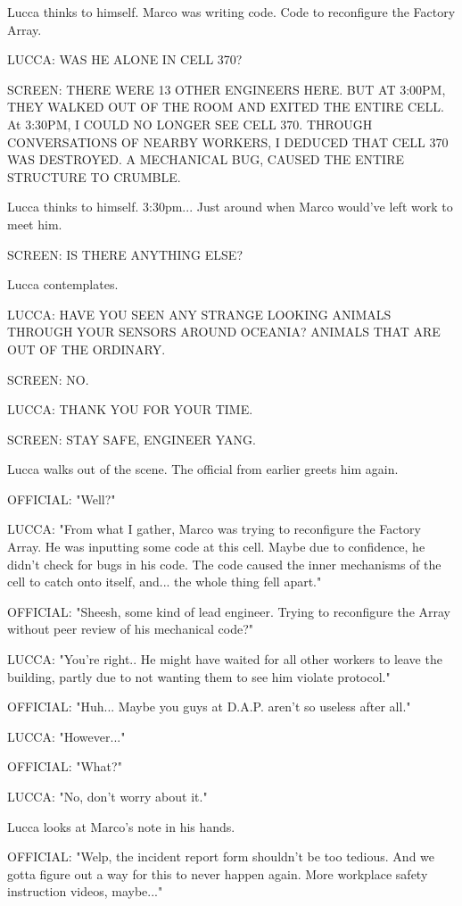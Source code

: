 \documentclass[11pt]{article}
\begin{document}
Lucca thinks to himself. Marco was writing code. Code to reconfigure the Factory Array.

LUCCA: WAS HE ALONE IN CELL 370?

SCREEN: THERE WERE 13 OTHER ENGINEERS HERE. BUT AT 3:00PM, THEY WALKED OUT OF THE ROOM AND EXITED THE ENTIRE CELL. At 3:30PM, I COULD NO LONGER SEE CELL 370. THROUGH CONVERSATIONS OF NEARBY WORKERS, I DEDUCED THAT CELL 370 WAS DESTROYED. A MECHANICAL BUG, CAUSED THE ENTIRE STRUCTURE TO CRUMBLE. 

Lucca thinks to himself. 3:30pm... Just around when Marco would've left work to meet him. 

SCREEN: IS THERE ANYTHING ELSE?

Lucca contemplates.

LUCCA: HAVE YOU SEEN ANY STRANGE LOOKING ANIMALS THROUGH YOUR SENSORS AROUND OCEANIA? ANIMALS THAT ARE OUT OF THE ORDINARY. 

SCREEN: NO.

LUCCA: THANK YOU FOR YOUR TIME.

SCREEN: STAY SAFE, ENGINEER YANG.

Lucca walks out of the scene. The official from earlier greets him again.

OFFICIAL: "Well?"

LUCCA: "From what I gather, Marco was trying to reconfigure the Factory Array. He was inputting some code at this cell. Maybe due to confidence, he didn't check for bugs in his code. The code caused the inner mechanisms of the cell to catch onto itself, and... the whole thing fell apart."

OFFICIAL: "Sheesh, some kind of lead engineer. Trying to reconfigure the Array without peer review of his mechanical code?"

LUCCA: "You're right.. He might have waited for all other workers to leave the building, partly due to not wanting them to see him violate protocol."

OFFICIAL: "Huh... Maybe you guys at D.A.P. aren't so useless after all."

LUCCA: "However..."

OFFICIAL: "What?"

LUCCA: "No, don't worry about it."

Lucca looks at Marco's note in his hands. 

OFFICIAL: "Welp, the incident report form shouldn't be too tedious. And we gotta figure out a way for this to never happen again. More workplace safety instruction videos, maybe..."
\end{document}
